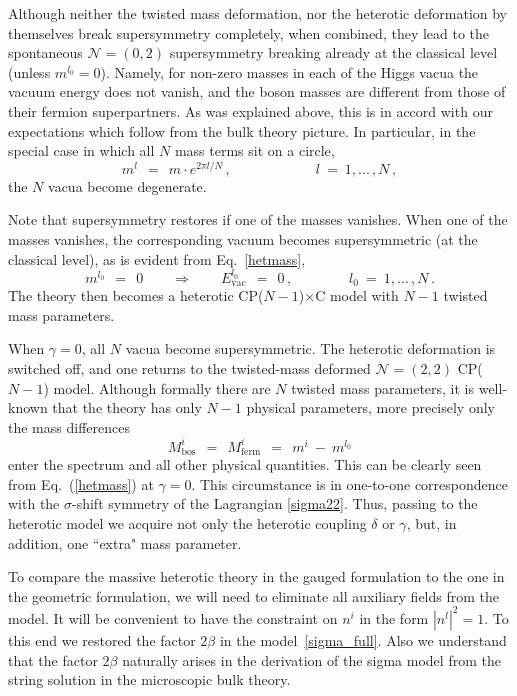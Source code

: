 \documentclass[12pt]{article}
\newcommand{\ntwot}{${\mathcal N}= \left(2,2\right) $ }
\newcommand{\ntwoo}{${\mathcal N}= \left(0,2\right) $ }
\newcommand{\CPC}{CP($N-1$)$\times$C }
\begin{document}
	Although neither the twisted mass deformation, nor the heterotic deformation by themselves break supersymmetry completely, when combined, they lead to the spontaneous \ntwoo supersymmetry breaking
	already at the classical level (unless $m^{l_0}=0$).
 Namely, for non-zero masses 
in each of the Higgs vacua
the vacuum energy does not vanish,  and the boson masses are different from those of their fermion superpartners. As was explained
above, this is in accord with our expectations which follow
from the bulk theory picture. In particular, in the special case in which all $N$ mass terms sit on a circle, 
\[
	m^l ~~=~~ m \cdot e^{2\pi l/N}\,, \qquad\qquad\qquad  l ~=~ 1,...\,, N\,,
\]
	the $ N $ vacua become degenerate.

	Note that supersymmetry restores if one of the masses vanishes.
	When one of the masses vanishes, the corresponding vacuum becomes supersymmetric
	(at the classical level), as is evident from 
	Eq.~\eqref{hetmass},
\[
	m^{l_0} ~~=~~ 0  \qquad \Rightarrow \qquad E_\text{vac}^{l_0} ~~=~~ 0\,, \qquad\qquad l_0 ~=~ 1,...\,, N\,.
\]
	The theory then becomes a heterotic \CPC model with $ N - 1 $ twisted mass parameters.

	When $ \gamma = 0 $,   all $ N $ vacua become supersymmetric.
	The heterotic deformation is switched off,
	 and one returns to the twisted-mass deformed \ntwot CP($N-1$) model.
	Although formally there are $ N $ twisted mass parameters, it is well-known that the theory 
	has only $ N - 1 $ physical parameters, more precisely only the mass differences
\[
	M_\text{bos}^i ~~=~~ M_\text{ferm}^i ~~=~~ m^i ~-~ m^{l_0}
\]
enter the spectrum and all other physical
quantities. This can be clearly seen from 
Eq.~(\ref{hetmass}) at $\gamma =0$. This circumstance is in one-to-one correspondence
with the $\sigma$-shift symmetry of 
the Lagrangian \eqref{sigma22}. Thus, passing
to the heterotic model we acquire not only the heterotic coupling $\delta$ or $\gamma$,
but, in addition, one ``extra" mass parameter.
	
        To compare the massive heterotic theory in the gauged  formulation to
        the one in the geometric formulation, we will need to eliminate all auxiliary fields from the model. It will be convenient  to have the constraint on $n^i$ in the
        form $ | n^l |^2 = 1 $. To this end we restored the factor 
        $ 2\beta $ in  the model~\eqref{sigma_full}.
        Also we understand that the factor   $ 2\beta $  naturally arises in the 
derivation of  the sigma model from the   string
solution in the microscopic bulk theory.
\end{document}
